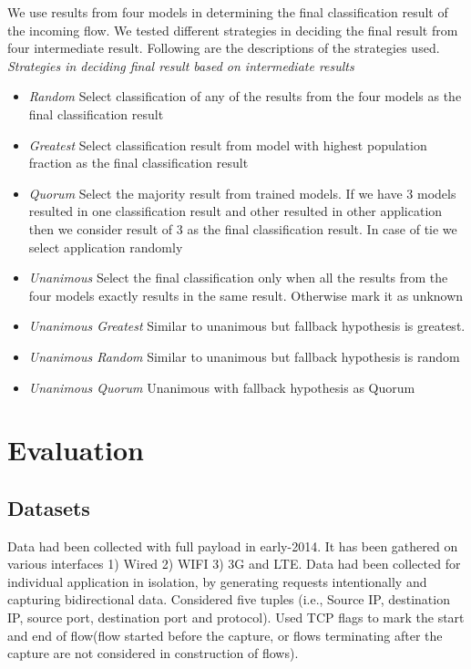 \documentclass[conference]{IEEEtran}
\begin{document}
We use results from four models in determining the final classification result of the incoming flow. We tested different strategies in deciding the final result from four intermediate result. Following are the descriptions of the strategies used.
\emph{Strategies in deciding final result based on intermediate results}
\begin{itemize} \itemsep3pt \parskip3pt 
	\item \emph{Random}
	Select classification of any of the results from the four models as the final classification result
	\item \emph{Greatest}
	Select classification result from model with highest population fraction as the final classification result
	\item \emph{Quorum}
	Select the majority result from trained models. If we have 3 models resulted in one classification result and other resulted in other application then we consider result of 3 as the final classification result. In case of tie we select application randomly
	\item \emph{Unanimous}
	Select the final classification only when all the results from the four models exactly results in the same result. Otherwise mark it as unknown
	\item \emph{Unanimous Greatest}
	Similar to unanimous but fallback hypothesis is greatest.
	\item \emph{Unanimous Random}
	Similar to unanimous but fallback hypothesis is random
	\item \emph{Unanimous Quorum}
	Unanimous with fallback hypothesis as Quorum
\end{itemize}

\section{Evaluation}
\label{sec:eval}
\subsection{Datasets}
Data had been collected with full payload in early-2014. It has been gathered on various interfaces 1) Wired 2) WIFI 3) 3G and LTE. Data had been collected for individual application in isolation, by generating requests intentionally and capturing bidirectional data.  Considered five tuples (i.e., Source IP, destination IP, source port, destination port and protocol). Used TCP flags to mark the start and end of flow(flow started before the capture, or flows terminating after the capture are not considered in construction of flows).
\end{document}
